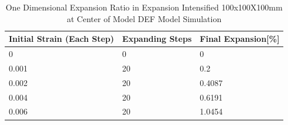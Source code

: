 \begin{table}[ht!]
\centering
\begin{tabular}{ ||p{2cm}|p{2cm}|p{2cm}| }
 \hline
    Initial Strain (Each Step) & Expanding Steps &  Final Expansion[\%] \\ [0.5ex]
 \hline\hline
  0 & 0 & 0 \\
  0.001 & 20 & 0.2 \\
  0.002 & 20 & 0.4087 \\
  0.004 & 20 & 0.6191 \\
  0.006 & 20 & 1.0454 \\
 \hline
\end{tabular}
\caption{One Dimensional Expansion Ratio in Expansion Intensified 100x100X100mm at Center of Model DEF Model Simulation}
\label{table:DEF_X-1_EXP}
\end{table}

